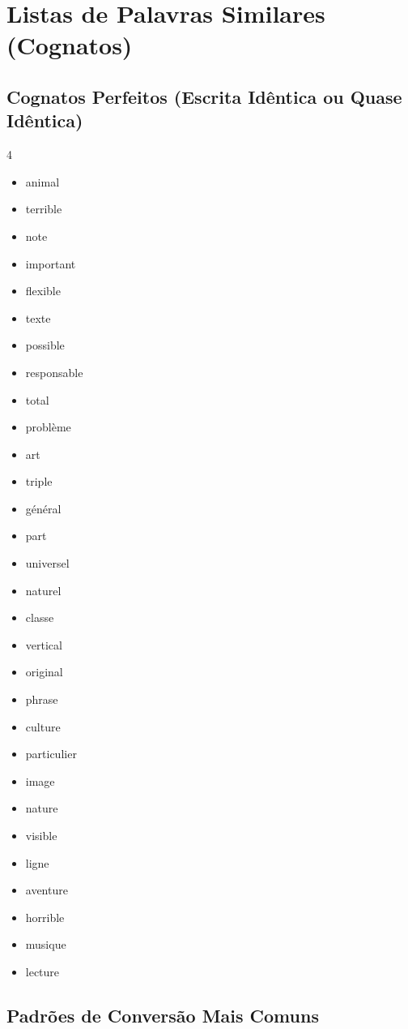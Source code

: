 \documentclass[a4paper,12pt]{article}
\begin{document}
\section{Listas de Palavras Similares (Cognatos)}
\subsection{Cognatos Perfeitos (Escrita Idêntica ou Quase Idêntica)}
\begin{multicols}{4}
\begin{itemize}
    \item animal
    \item terrible
    \item note
    \item important
    \item flexible
    \item texte
    \item possible
    \item responsable
    \item total
    \item problème
    \item art
    \item triple
    \item général
    \item part
    \item universel
    \item naturel
    \item classe
    \item vertical
    \item original
    \item phrase
    \item culture
    \item particulier
    \item image
    \item nature
    \item visible
    \item ligne
    \item aventure
    \item horrible
    \item musique
    \item lecture
\end{itemize}
\end{multicols}

\subsection{Padrões de Conversão Mais Comuns}
\end{document}

